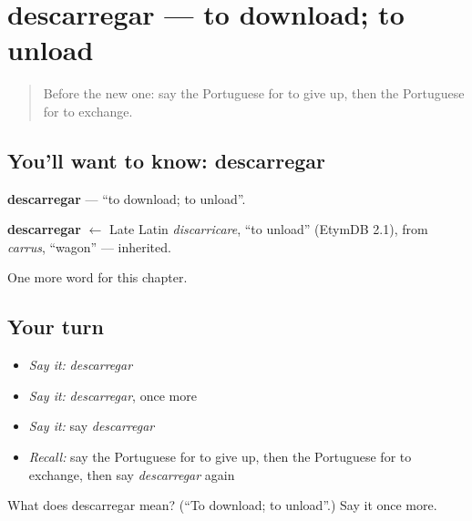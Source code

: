 \section[descarregar]{descarregar — to download; to unload}

\label{lesson:PT-C208-descarregar}



\begin{quote}
Before the new one: say the Portuguese for to give up, then the Portuguese for to exchange.
\end{quote}

\subsection*{You'll want to know: descarregar}
\textbf{descarregar} — \textquotedblleft{}to download; to unload\textquotedblright{}.

\begin{cousinweb}
\textbf{descarregar} $\leftarrow$ Late Latin \emph{discarricare}, \textquotedblleft{}to unload\textquotedblright{} (EtymDB 2.1), from \emph{carrus}, \textquotedblleft{}wagon\textquotedblright{} — inherited.
\end{cousinweb}

\begin{grammarlens}[title={What you've built}]
One more word for this chapter.
\end{grammarlens}

\subsection*{Your turn}
\begin{itemize}
\raggedright
  \item \emph{Say it:} \emph{descarregar}
  \item \emph{Say it:} \emph{descarregar}, once more
  \item \emph{Say it:} say \emph{descarregar}
  \item \emph{Recall:} say the Portuguese for to give up, then the Portuguese for to exchange, then say \emph{descarregar} again
\end{itemize}

\begin{tcolorbox}[breakable,colback=teal!4,colframe=teal!35!black,title={Before you move on}]
What does descarregar mean? (\textquotedblleft{}To download; to unload\textquotedblright{}.) Say it once more.
\end{tcolorbox}
